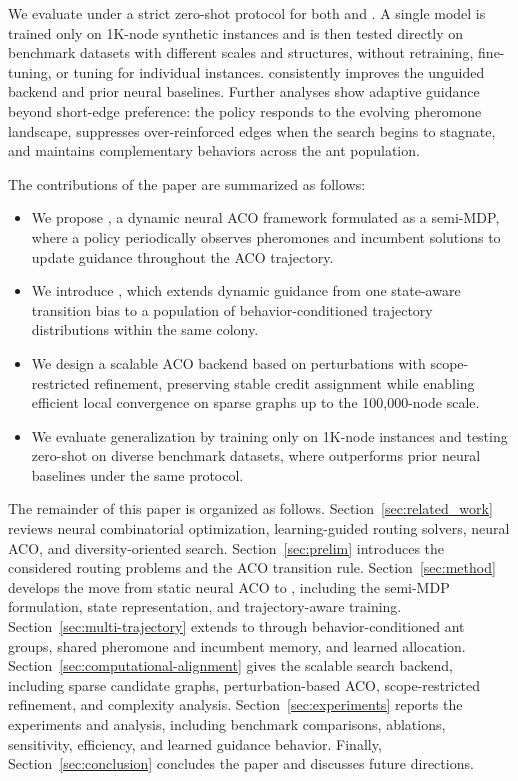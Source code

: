 We evaluate \DyNACS{} under a strict zero-shot protocol for both \TSP{} and \CVRP{}. A single model is trained only on 1K-node synthetic instances and is then tested directly on benchmark datasets with different scales and structures, without retraining, fine-tuning, or tuning for individual instances. \DyNACS{} consistently improves the unguided backend and prior neural baselines. Further analyses show adaptive guidance beyond short-edge preference: the policy responds to the evolving pheromone landscape, suppresses over-reinforced edges when the search begins to stagnate, and maintains complementary behaviors across the ant population.

The contributions of the paper are summarized as follows:
\begin{itemize}
\item We propose \DyNACO{}, a dynamic neural ACO framework formulated as a semi-MDP, where a policy periodically observes pheromones and incumbent solutions to update guidance throughout the ACO trajectory.
\item We introduce \DyNACS{}, which extends dynamic guidance from one state-aware transition bias to a population of behavior-conditioned trajectory distributions within the same colony.
\item We design a scalable ACO backend based on perturbations with scope-restricted refinement, preserving stable credit assignment while enabling efficient local convergence on sparse graphs up to the 100,000-node scale.
\item We evaluate generalization by training only on 1K-node instances and testing zero-shot on diverse benchmark datasets, where \DyNACS{} outperforms prior neural baselines under the same protocol.
\end{itemize}

The remainder of this paper is organized as follows. Section~\ref{sec:related_work} reviews neural combinatorial optimization, learning-guided routing solvers, neural ACO, and diversity-oriented search. Section~\ref{sec:prelim} introduces the considered routing problems and the ACO transition rule. Section~\ref{sec:method} develops the move from static neural ACO to \DyNACO{}, including the semi-MDP formulation, state representation, and trajectory-aware training. Section~\ref{sec:multi-trajectory} extends \DyNACO{} to \DyNACS{} through behavior-conditioned ant groups, shared pheromone and incumbent memory, and learned allocation. Section~\ref{sec:computational-alignment} gives the scalable search backend, including sparse candidate graphs, perturbation-based ACO, scope-restricted refinement, and complexity analysis. Section~\ref{sec:experiments} reports the experiments and analysis, including benchmark comparisons, ablations, sensitivity, efficiency, and learned guidance behavior. Finally, Section~\ref{sec:conclusion} concludes the paper and discusses future directions.
